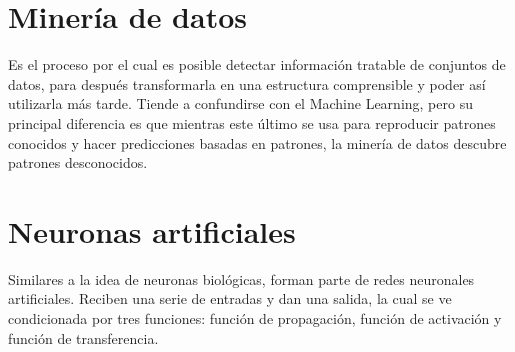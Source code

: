 \section{Minería de datos} Es el proceso por el cual es posible detectar información tratable de conjuntos de datos, para después transformarla en una estructura comprensible y poder así utilizarla más tarde.
Tiende a confundirse con el Machine Learning, pero su principal diferencia es que mientras este último se usa para reproducir patrones conocidos y hacer predicciones basadas en patrones, la minería de datos descubre patrones desconocidos.

\section{Neuronas artificiales}
Similares a la idea de neuronas biológicas, forman parte de redes neuronales artificiales. Reciben una serie de entradas y dan una salida, la cual se ve condicionada por tres funciones: función de propagación, función de activación y función de transferencia.

